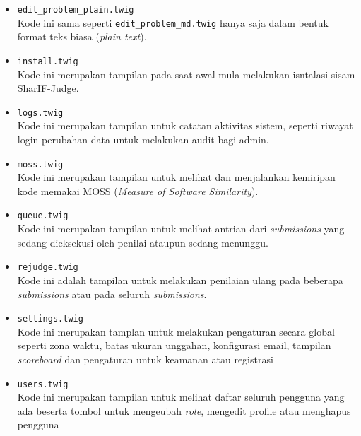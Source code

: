 \begin{itemize}
\begin{itemize}
\begin{itemize}
			            \item \verb|edit_problem_plain.twig|\\
                        Kode ini sama seperti \verb|edit_problem_md.twig| hanya saja dalam bentuk format teks biasa (\textit{plain text}).
			            \item \verb|install.twig|\\
                        Kode ini merupakan tampilan pada saat awal mula melakukan isntalasi sisam SharIF-Judge.
			            \item \verb|logs.twig|\\
                        Kode ini merupakan tampilan untuk catatan aktivitas sistem, seperti riwayat login perubahan data untuk melakukan audit bagi admin.
			            \item \verb|moss.twig|\\
                        Kode ini merupakan tampilan untuk melihat dan menjalankan kemiripan kode memakai MOSS (\textit{Measure of Software Similarity}).
			            \item \verb|queue.twig|\\
                        Kode ini merupakan tampilan untuk melihat antrian dari \textit{submissions} yang sedang dieksekusi oleh penilai ataupun sedang menunggu.
			            \item \verb|rejudge.twig|\\
                        Kode ini adalah tampilan untuk melakukan penilaian ulang pada beberapa \textit{submissions} atau pada seluruh \textit{submissions}.
			            \item \verb|settings.twig|\\
                        Kode ini merupakan tamplan untuk melakukan pengaturan secara global seperti zona waktu, batas ukuran unggahan, konfigurasi email, tampilan \textit{scoreboard} dan pengaturan untuk keamanan atau registrasi
			            \item \verb|users.twig|\\
                        Kode ini merupakan tampilan untuk melihat daftar seluruh pengguna yang ada beserta tombol untuk mengeubah \textit{role}, mengedit profile atau menghapus pengguna
		            \end{itemize}


\end{itemize}
\end{itemize}
